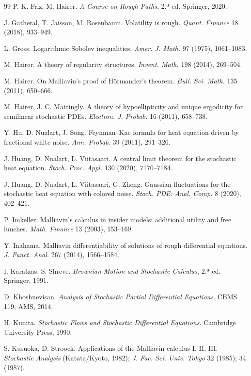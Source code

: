 \begin{thebibliography}{99}
 P. K. Friz, M. Hairer. \emph{A Course on Rough Paths}, 2.ª ed. Springer, 2020.

 J. Gatheral, T. Jaisson, M. Rosenbaum. Volatility is rough. \emph{Quant. Finance} 18 (2018), 933--949.

 L. Gross. Logarithmic Sobolev inequalities. \emph{Amer. J. Math.} 97 (1975), 1061--1083.

 M. Hairer. A theory of regularity structures. \emph{Invent. Math.} 198 (2014), 269--504.

 M. Hairer. On Malliavin's proof of Hörmander's theorem. \emph{Bull. Sci. Math.} 135 (2011), 650--666.

 M. Hairer, J. C. Mattingly. A theory of hypoellipticity and unique ergodicity for semilinear stochastic
PDEs. \emph{Electron. J. Probab.} 16 (2011), 658--738.

 Y. Hu, D. Nualart, J. Song. Feynman--Kac formula for heat equation driven by fractional white
noise. \emph{Ann. Probab.} 39 (2011), 291--326.

 J. Huang, D. Nualart, L. Viitasaari. A central limit theorem for the stochastic heat equation. \emph{Stoch.
Proc. Appl.} 130 (2020), 7170--7184.

 J. Huang, D. Nualart, L. Viitasaari, G. Zheng. Gaussian fluctuations for the stochastic heat equation
with colored noise. \emph{Stoch. PDE: Anal. Comp.} 8 (2020), 402--421.

 P. Imkeller. Malliavin's calculus in insider models: additional utility and free lunches. \emph{Math. Finance}
13 (2003), 153--169.

 Y. Inahama. Malliavin differentiability of solutions of rough differential equations. \emph{J. Funct. Anal.}
267 (2014), 1566--1584.

 I. Karatzas, S. Shreve. \emph{Brownian Motion and Stochastic Calculus}, 2.ª ed. Springer, 1991.

 D. Khoshnevisan. \emph{Analysis of Stochastic Partial Differential Equations}. CBMS 119, AMS, 2014.

 H. Kunita. \emph{Stochastic Flows and Stochastic Differential Equations}. Cambridge University Press,
1990.

 S. Kusuoka, D. Stroock. Applications of the Malliavin calculus I, II, III. \emph{Stochastic Analysis}
(Katata/Kyoto, 1982); \emph{J. Fac. Sci. Univ. Tokyo} 32 (1985); 34 (1987).


\end{thebibliography}

